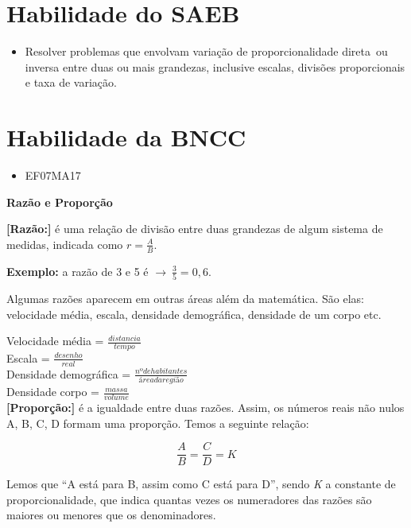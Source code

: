 \section{Habilidade do SAEB}
\begin{itemize}
\item Resolver problemas que envolvam variação de
proporcionalidade direta~ou inversa entre duas ou mais grandezas,
inclusive escalas, divisões proporcionais e taxa de variação.
\end{itemize}

\section{Habilidade da BNCC}
\begin{itemize}
\item EF07MA17
\end{itemize}


\textbf{Razão e Proporção}

\textbf{{[}Razão:{]}} é uma relação de divisão entre duas grandezas de
algum sistema de medidas, indicada como $r  = \frac{A}{B}$.

\textbf{Exemplo:} a razão de 3 e 5 é
$\rightarrow \ \frac{3}{5} = 0,6$.

Algumas razões aparecem em outras áreas além da matemática. São elas:
velocidade média, escala, densidade demográfica, densidade de um corpo
etc.

Velocidade média = $\frac{distancia}{tempo}$ \\

Escala = $\frac{desenho}{real}$ \\

Densidade demográfica = $\frac{nº de habitantes}{área da região}$ \\

Densidade  corpo = $\frac{massa}{volume}$ \\

\textbf{{[}Proporção:{]}} é a igualdade entre duas razões. Assim, os
números reais não nulos A, B, C, D formam uma proporção. Temos a
seguinte relação:

$$\frac{A}{B} = \frac{C}{D} = K$$

Lemos que ``A está para B, assim como C está para D'', sendo \emph{K} a
constante de proporcionalidade, que indica quantas vezes os numeradores
das razões são maiores ou menores que os denominadores.

